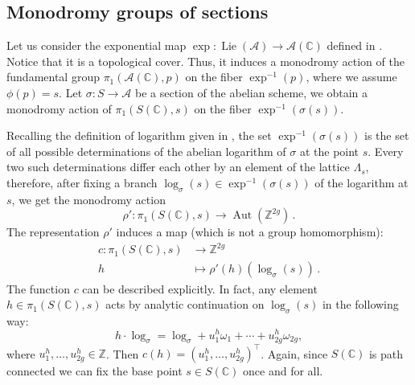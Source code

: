 \documentclass[10 pt,a4paper]{article}
\theoremstyle{plain}
\theoremstyle{definition}
\theoremstyle{named}
\DeclareMathOperator{\Aut}{Aut}
\newcommand{\cA}{\mathcal A}
\newcommand{\bC}{\mathbb C}
\newcommand{\bZ}{\mathbb Z}
\DeclareMathOperator{\Lie}{Lie}
\begin{document}
\subsection{Monodromy groups of sections}


Let us consider the exponential map $\exp: \Lie(\cA) \to \cA(\mathbb C)$ defined in . Notice that it is a topological cover. Thus, it induces a monodromy action of the fundamental group $\pi_1(\cA(\bC),p)$ on the fiber $\exp^{-1}(p)$, where we assume $\phi(p)=s$. Let $\sigma: S \to \cA$ be a section of the abelian scheme, we obtain a monodromy action of $\pi_1(S(\bC),s)$ on the fiber $\exp^{-1}(\sigma(s))$.

Recalling the definition of logarithm given in , the set $\exp^{-1}(\sigma(s))$ is the set of all possible determinations of the abelian logarithm of $\sigma$ at the point $s$. Every two such determinations differ each other by an element of the lattice $\Lambda_s$, therefore, after fixing a branch $\log_\sigma(s)\in\exp^{-1}(\sigma(s)) $ of the logarithm at $s$, we get the monodromy action
\begin{equation*}
    \rho': \pi_1(S(\bC),s) \to \Aut(\mathbb Z^{2g})\,.   
\end{equation*}
The representation $\rho'$  induces a map (which is not a group homomorphism):
\begin{equation}\label{monLog}
\begin{aligned}
    c: \pi_1(S(\bC),s) &\to \bZ^{2g}\\
    h &\mapsto \rho'(h)(\log_\sigma(s))\,.
\end{aligned}
\end{equation}
The function $c$ can be described explicitly. In fact, any element $h \in \pi_1(S(\bC),s)$ acts by analytic continuation on $\log_\sigma(s)$ in the following way:
\begin{equation}\label{actionLog}
	h\cdot\log_\sigma=\log_\sigma + u_1^h\omega_1 + \cdots + u_{2g}^h\omega_{2g},
\end{equation}
where $u_1^h,\ldots, u_{2g}^h \in \bZ$. Then $c(h)=(u^h_1, \ldots, u^h_{2g})^\top$. Again, since $S(\mathbb C)$ is path connected we can fix the base point $s\in S(\mathbb C)$ once and for all.  
\end{document}
